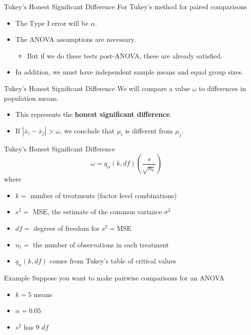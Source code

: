 \begin{frame}{Tukey's Honest Significant Difference}
    For Tukey's method for paired comparisons
    \begin{itemize}
        \item The Type I error will be $\alpha$.
        \item The ANOVA assumptions are necessary.
        \begin{itemize}
            \item But if we do these tests post-ANOVA, these are already satisfied.
        \end{itemize}
        \item In addition, we must have independent sample means and equal group sizes.
    \end{itemize}
\end{frame}

\begin{frame}{Tukey's Honest Significant Difference}
    We will compare a value $\omega$ to differences in population means.
    \begin{itemize}
        \item This represents the \textbf{honest significant difference}.
        \item If $|\bar{x}_i-\bar{x}_j| > \omega$, we conclude that $\mu_i$ is different from $\mu_j$.
    \end{itemize}
\end{frame}

\begin{frame}{Tukey's Honest Significant Difference}
    \[
        \omega = q_{\alpha}(k, df)\left(\frac{s}{\sqrt{n_t}}\right)
    \]
    where
    \begin{itemize}
        \item $k=$ number of treatments (factor level combinations)
        \item $s^2=$ MSE, the estimate of the common variance $\sigma^2$
        \item $df=$ degrees of freedom for $s^2=$MSE
        \item $n_t=$ the number of observations in each treatment
        \item $q_{\alpha}(k, df)$ comes from Tukey's table of critical values
    \end{itemize}
\end{frame}

\begin{frame}{Example}
    Suppose you want to make pairwise comparisons for an ANOVA
    \begin{itemize}
        \item $k =5$ means 
        \item $\alpha=0.05$
        \item $s^2$ has 9 $df$
    \end{itemize}
\end{frame}

